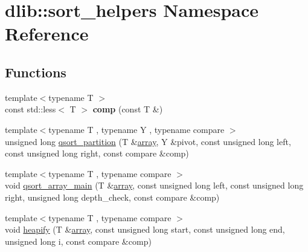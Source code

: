 \hypertarget{namespacedlib_1_1sort__helpers}{
\section{dlib::sort\_\-helpers Namespace Reference}
\label{namespacedlib_1_1sort__helpers}
}
\subsection*{Functions}
\begin{DoxyCompactItemize}
\item 
\hypertarget{namespacedlib_1_1sort__helpers_a2b441f89ae975a98bec6aeca405b251c}{
{\footnotesize template$<$typename T $>$ }\\const std::less$<$ T $>$ {\bfseries comp} (const T \&)}
\label{namespacedlib_1_1sort__helpers_a2b441f89ae975a98bec6aeca405b251c}

\item 
{\footnotesize template$<$typename T , typename Y , typename compare $>$ }\\unsigned long \hyperlink{namespacedlib_1_1sort__helpers_a57c163f0e0bcd4ba7f32d5457a6397df}{qsort\_\-partition} (T \&\hyperlink{classdlib_1_1array}{array}, Y \&pivot, const unsigned long left, const unsigned long right, const compare \&comp)
\item 
{\footnotesize template$<$typename T , typename compare $>$ }\\void \hyperlink{namespacedlib_1_1sort__helpers_ab2a0fe3633430a6436f3997846e2b231}{qsort\_\-array\_\-main} (T \&\hyperlink{classdlib_1_1array}{array}, const unsigned long left, const unsigned long right, unsigned long depth\_\-check, const compare \&comp)
\item 
{\footnotesize template$<$typename T , typename compare $>$ }\\void \hyperlink{namespacedlib_1_1sort__helpers_ac32391188081266e35f6b3934704a224}{heapify} (T \&\hyperlink{classdlib_1_1array}{array}, const unsigned long start, const unsigned long end, unsigned long i, const compare \&comp)
\end{DoxyCompactItemize}


